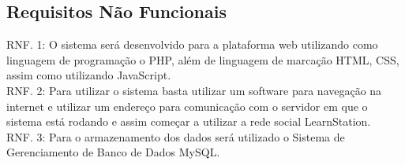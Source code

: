 \documentclass[12pt,a4paper,onecolumn,titlepage]{article}
\begin{document}
\subsection{Requisitos Não Funcionais}

\qquad RNF. 1: O sistema será desenvolvido para a plataforma web utilizando como linguagem de programação o PHP, além de linguagem de marcação HTML, CSS, assim como utilizando JavaScript.\\

RNF. 2: Para utilizar o sistema basta utilizar um software para navegação na internet e utilizar um endereço para comunicação com o servidor em que o sistema está rodando e assim começar a utilizar a rede social LearnStation.\\

RNF. 3: Para o armazenamento dos dados será utilizado o Sistema de Gerenciamento de Banco de Dados MySQL.\\








%
%
\end{document}
